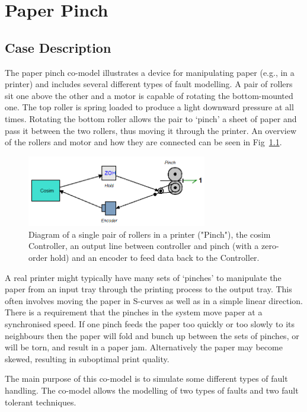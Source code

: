 \chapter{Paper Pinch} \label{chap:pidPinch}

\section{Case Description}
The paper pinch co-model illustrates a device for
manipulating paper (e.g., in a printer) and includes several
different types of fault modelling. A pair of rollers sit one
above the other and a motor is capable of rotating the
bottom-mounted one. The top roller is spring loaded to produce a
light downward pressure at all times. Rotating the bottom roller
allows the pair to `pinch' a sheet of paper and pass it between
the two rollers, thus moving it through the printer. An overview
of the rollers and motor and how they are connected can be seen
in Fig~\ref{fig:paperPinch}.

\begin{figure}[!ht] \centering
\includegraphics[width=0.7\textwidth]{pidPinch/pidPinch.png}
\caption{Diagram of a single pair of rollers in a printer
("Pinch"), the cosim Controller, an output line between
controller and pinch (with a zero-order hold) and an encoder to
feed data back to the Controller.} \label{fig:paperPinch}
\end{figure}

A real printer might typically have many sets of `pinches' to
manipulate the paper from an input tray through the printing
process to the output tray. This often involves moving the paper
in S-curves as well as in a simple linear direction. There is a
requirement that the pinches in the system move paper at a
synchronised speed. If one pinch feeds the paper too quickly or
too slowly to its neighbours then the paper will fold and bunch
up between the sets of pinches, or will be torn, and result in a
paper jam. Alternatively the paper may become skewed,
resulting in suboptimal print quality.

The main purpose of this co-model is to simulate some different
types of fault handling. The co-model allows the modelling of
two types of faults and two fault tolerant techniques.

